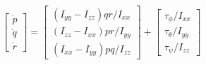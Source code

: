 \begin{equation}\label{eq:torque}
  \begin{bmatrix} 
    \dot{p} \\
    \dot{q} \\ 
    \dot{r} 
  \end{bmatrix} = \begin{bmatrix} 
                    (I_{yy} - I_{zz})qr/I_{xx} \\
                    (I_{zz} - I_{xx})pr/I_{yy} \\
                    (I_{xx} - I_{yy})pq/I_{zz} 
                  \end{bmatrix} + \begin{bmatrix} 
                                    \tau_\phi/I_{xx} \\
                                    \tau_\theta/I_{yy} \\ 
                                    \tau_\psi/I_{zz} 
                                  \end{bmatrix}  
\end{equation}


